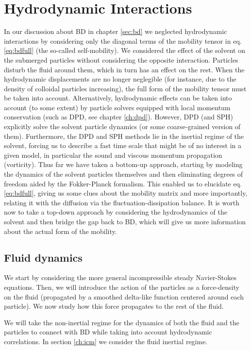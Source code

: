 \documentclass[ twoside,openright,titlepage,numbers=noenddot,%
headinclude,footinclude,cleardoublepage=empty,abstract=on,
BCOR=5mm,paper=a4,fontsize=11pt, dvipsnames
]{scrreprt}
\begin{document}
\chapter{Hydrodynamic Interactions}\label{sec:bdhi}
In our discussion about \gls{BD} in chapter \ref{sec:bd} we neglected hydrodynamic interactions by considering only the diagonal terms of the mobility tensor in eq. \eqref{eq:bdfull} (the so-called self-mobility). We considered the effect of the solvent on the submerged particles without considering the opposite interaction. Particles disturb the fluid around them, which in turn has an effect on the rest. When the hydrodynamic displacements are no longer neglegible (for instance, due to the density of colloidal particles increasing), the full form of the mobility tensor must be taken into account. Alternatively, hydrodynamic effects can be taken into account (to some extent) by particle solvers equipped with local momentum conservation (such as \gls{DPD}, see chapter \ref{ch:dpd}). However, \gls{DPD} (and \gls{SPH}) explicitly solve the solvent particle dynamics (or some coarse-grained version of them). Furthermore, the \gls{DPD} and \gls{SPH} methods lie in the inertial regime of the solvent, forcing us to describe a fast time scale that might be of no interest in a given model, in particular the sound and viscous momentum propagation (vorticity). Thus far we have taken a bottom-up approach, starting by modeling the dynamics of the solvent particles themselves and then eliminating degrees of freedom aided by the Fokker-Planck formalism. This enabled us to elucidate eq. \eqref{eq:bdfull}, giving us some clues about the mobility matrix and more importantly, relating it with the diffusion via the fluctuation-dissipation balance. It is worth now to take a top-down approach by considering the hydrodynamics of the solvent and then bridge the gap back to \gls{BD}, which will give us more information about the actual form of the mobility.
\section*{Fluid dynamics}
We start by considering the more general incompressible steady Navier-Stokes equations. Then, we will introduce the action of the particles as a force-density on the fluid (propagated by a smoothed delta-like function centered around each particle). We now study how this force propagates to the rest of the fluid.

We will take the non-inertial regime for the dynamics of both the fluid and the particles to connect with \gls{BD} while taking into account hydrodynamic correlations. In section \ref{ch:icm} we consider the fluid inertial regime.
\end{document}
